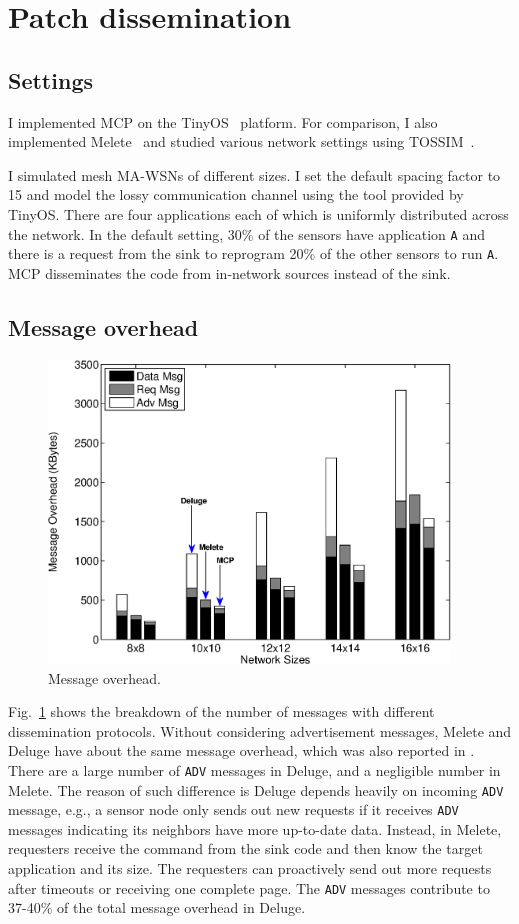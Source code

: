 \section{Patch dissemination}
\subsection{Settings}
I implemented MCP on the TinyOS~\cite{tinyos} platform. For comparison, I also implemented Melete~\cite{melete} and studied various network settings using TOSSIM~\cite{tossim}. 

I simulated mesh MA-WSNs of different sizes. I set the default spacing factor to 15 and model the lossy communication channel using the tool provided by TinyOS. There are four applications each of which is uniformly distributed across the network. In the default setting, 30\% of the sensors have application {\tt A} and there is a request from the sink to reprogram 20\% of the other sensors to run {\tt A}. MCP disseminates the code from in-network sources instead of the sink. 

\subsection{Message overhead}

\begin{figure}[htbp]
\centering
\includegraphics[width=4.2in]{figures/fsizes.eps}
\caption{Message overhead.}
\label{fmsg}
\end{figure}

Fig.~\ref{fmsg} shows the breakdown of the number of messages with different dissemination protocols. Without considering advertisement messages, Melete and Deluge have about the same message overhead, which was also reported in \cite{melete}. There are a large number of {\tt ADV} messages in Deluge, and a negligible number in Melete. The reason of such difference is Deluge depends heavily on incoming {\tt ADV} message, e.g., a sensor node only sends out new requests if it receives {\tt ADV} messages indicating its neighbors have more up-to-date data. Instead, in Melete, requesters receive the command from the sink code and then know the target application and its size. The requesters can proactively send out more requests after timeouts or receiving one complete page. The {\tt ADV} messages contribute to 37-40\% of the total message overhead in Deluge. 

